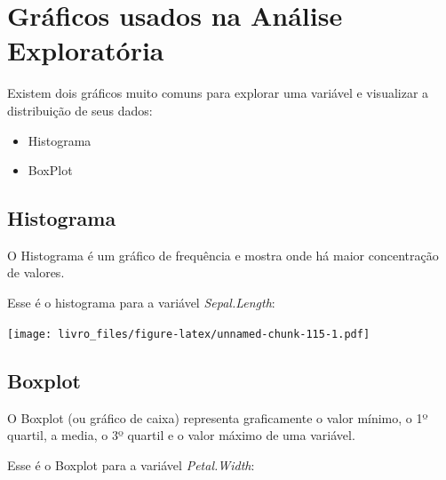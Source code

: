 \documentclass[
]{book}
\newenvironment{Shaded}{\begin{snugshade}}{\end{snugshade}}
\newcommand{\KeywordTok}[1]{\textcolor[rgb]{0.13,0.29,0.53}{\textbf{#1}}}
\newcommand{\NormalTok}[1]{#1}
\newcommand{\OperatorTok}[1]{\textcolor[rgb]{0.81,0.36,0.00}{\textbf{#1}}}
\providecommand{\tightlist}{%
  \setlength{\itemsep}{0pt}\setlength{\parskip}{0pt}}
\begin{document}
\hypertarget{gruxe1ficos-usados-na-anuxe1lise-exploratuxf3ria}{%
\section{Gráficos usados na Análise
Exploratória}\label{gruxe1ficos-usados-na-anuxe1lise-exploratuxf3ria}}

Existem dois gráficos muito comuns para explorar uma variável e
visualizar a distribuição de seus dados:

\begin{itemize}
\tightlist
\item
  Histograma
\item
  BoxPlot
\end{itemize}

\hypertarget{histograma}{%
\subsection{Histograma}\label{histograma}}

O Histograma é um gráfico de frequência e mostra onde há maior
concentração de valores.

Esse é o histograma para a variável \emph{Sepal.Length}:

\begin{Shaded}
\end{Shaded}

\texttt{[image: livro\_files/figure-latex/unnamed-chunk-115-1.pdf]}

\hypertarget{boxplot}{%
\subsection{Boxplot}\label{boxplot}}

O Boxplot (ou gráfico de caixa) representa graficamente o valor mínimo,
o 1º quartil, a media, o 3º quartil e o valor máximo de uma variável.

Esse é o Boxplot para a variável \emph{Petal.Width}:

\begin{Shaded}
\end{Shaded}
\end{document}
